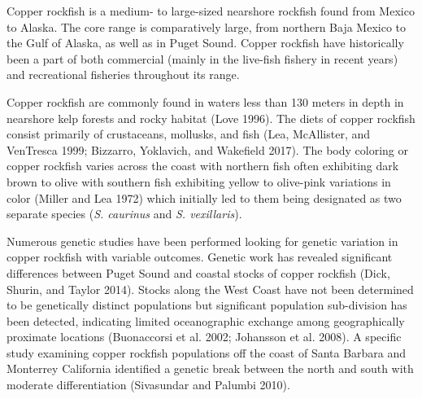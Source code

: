 \documentclass[11pt,
  english,
  a4paper,
]{article}
\begin{document}
\leavevmode\tagmcend\tagstructend\par


Copper rockfish is a medium- to large-sized nearshore rockfish found from Mexico to Alaska. The core range is comparatively large, from northern Baja Mexico to the Gulf of Alaska, as well as in Puget Sound. Copper rockfish have historically been a part of both commercial (mainly in the live-fish fishery in recent years) and recreational fisheries throughout its range.

\leavevmode\tagmcend\tagstructend\par


Copper rockfish are commonly found in waters less than 130 meters in depth in nearshore kelp forests and rocky habitat {(Love 1996)\leavevmode\tagmcend\tagstructend}. The diets of copper rockfish consist primarily of crustaceans, mollusks, and fish {(Lea, McAllister, and VenTresca 1999; Bizzarro, Yoklavich, and Wakefield 2017)\leavevmode\tagmcend\tagstructend}. The body coloring or copper rockfish varies across the coast with northern fish often exhibiting dark brown to olive with southern fish exhibiting yellow to olive-pink variations in color {(Miller and Lea 1972)\leavevmode\tagmcend\tagstructend} which initially led to them being designated as two separate species (\emph{S. caurinus} and \emph{S. vexillaris}).

\leavevmode\tagmcend\tagstructend\par


Numerous genetic studies have been performed looking for genetic variation in copper rockfish with variable outcomes. Genetic work has revealed significant differences between Puget Sound and coastal stocks of copper rockfish {(Dick, Shurin, and Taylor 2014)\leavevmode\tagmcend\tagstructend}. Stocks along the West Coast have not been determined to be genetically distinct populations but significant population sub-division has been detected, indicating limited oceanographic exchange among geographically proximate locations {(Buonaccorsi et al. 2002; Johansson et al. 2008)\leavevmode\tagmcend\tagstructend}. A specific study examining copper rockfish populations off the coast of Santa Barbara and Monterrey California identified a genetic break between the north and south with moderate differentiation {(Sivasundar and Palumbi 2010)\leavevmode\tagmcend\tagstructend}.
\end{document}
